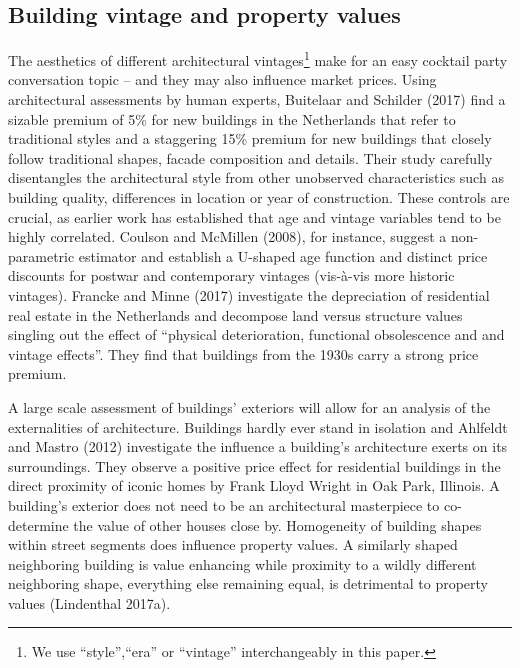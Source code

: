 \documentclass[]{article}
\let\rmarkdownfootnote\footnote%
\def\footnote{\protect\rmarkdownfootnote}
\begin{document}
\hypertarget{building-vintage-and-property-values}{%
\subsection{Building vintage and property
values}\label{building-vintage-and-property-values}}

The aesthetics of different architectural
vintages\footnote{We use ``style'',``era'' or ``vintage'' interchangeably in this paper.}
make for an easy cocktail party conversation topic -- and they may also
influence market prices. Using architectural assessments by human
experts, Buitelaar and Schilder (2017) find a sizable premium of 5\% for
new buildings in the Netherlands that refer to traditional styles and a
staggering 15\% premium for new buildings that closely follow
traditional shapes, facade composition and details. Their study
carefully disentangles the architectural style from other unobserved
characteristics such as building quality, differences in location or
year of construction. These controls are crucial, as earlier work has
established that age and vintage variables tend to be highly correlated.
Coulson and McMillen (2008), for instance, suggest a non-parametric
estimator and establish a U-shaped age function and distinct price
discounts for postwar and contemporary vintages (vis-à-vis more historic
vintages). Francke and Minne (2017) investigate the depreciation of
residential real estate in the Netherlands and decompose land versus
structure values singling out the effect of ``physical deterioration,
functional obsolescence and and vintage effects''. They find that
buildings from the 1930s carry a strong price premium.

A large scale assessment of buildings' exteriors will allow for an
analysis of the externalities of architecture. Buildings hardly ever
stand in isolation and Ahlfeldt and Mastro (2012) investigate the
influence a building's architecture exerts on its surroundings. They
observe a positive price effect for residential buildings in the direct
proximity of iconic homes by Frank Lloyd Wright in Oak Park, Illinois. A
building's exterior does not need to be an architectural masterpiece to
co-determine the value of other houses close by. Homogeneity of building
shapes within street segments does influence property values. A
similarly shaped neighboring building is value enhancing while proximity
to a wildly different neighboring shape, everything else remaining
equal, is detrimental to property values (Lindenthal 2017a).
\end{document}
